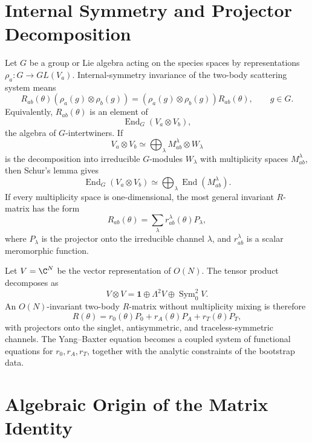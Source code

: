 \section{Internal Symmetry and Projector Decomposition}

Let \(G\) be a group or Lie algebra acting on the species spaces by
representations \(\rho_a:G\to GL(V_a)\).  Internal-symmetry invariance of the
two-body scattering system means
\[
  R_{ab}(\theta)(\rho_a(g)\otimes\rho_b(g))
  =
  (\rho_a(g)\otimes\rho_b(g))R_{ab}(\theta),
  \qquad g\in G .
\]
Equivalently, \(R_{ab}(\theta)\) is an element of
\[
  \operatorname{End}_G(V_a\otimes V_b),
\]
the algebra of \(G\)-intertwiners.  If
\[
  V_a\otimes V_b\simeq \bigoplus_{\lambda}
  M_{ab}^{\lambda}\otimes W_\lambda
\]
is the decomposition into irreducible \(G\)-modules \(W_\lambda\) with
multiplicity spaces \(M_{ab}^{\lambda}\), then Schur's lemma gives
\[
  \operatorname{End}_G(V_a\otimes V_b)
  \simeq
  \bigoplus_{\lambda}\operatorname{End}(M_{ab}^{\lambda}).
\]
If every multiplicity space is one-dimensional, the most general invariant
\(R\)-matrix has the form
\[
  R_{ab}(\theta)=\sum_{\lambda} r_{ab}^{\lambda}(\theta)P_{\lambda},
\]
where \(P_\lambda\) is the projector onto the irreducible channel
\(\lambda\), and \(r_{ab}^{\lambda}\) is a scalar meromorphic function.

\begin{example}
\label{ex:on-projector-channels}
Let \(V=\C^N\) be the vector representation of \(O(N)\).  The tensor product
decomposes as
\[
  V\otimes V
  =
  \mathbf 1\oplus \Lambda^2 V\oplus
  \operatorname{Sym}^2_0 V .
\]
An \(O(N)\)-invariant two-body \(R\)-matrix without multiplicity mixing is
therefore
\[
  R(\theta)=r_0(\theta)P_0+r_A(\theta)P_A+r_T(\theta)P_T,
\]
with projectors onto the singlet, antisymmetric, and traceless-symmetric
channels.  The Yang--Baxter equation becomes a coupled system of functional
equations for \(r_0,r_A,r_T\), together with the analytic constraints of the
bootstrap data.
\end{example}

\section{Algebraic Origin of the Matrix Identity}

